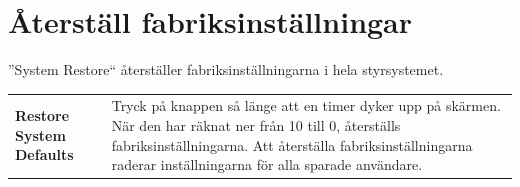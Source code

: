 \documentclass[12pt,a4paper,finnish]{uvmanual}
\begin{document}
\section{Återställ fabriksinställningar}\label{ch:system_restore}

''System Restore`` återställer fabriksinställningarna i hela styrsystemet.


\begin{tabular}{ L{0.2\textwidth} L{0.66\textwidth} }
\textbf{Restore System Defaults} & Tryck på knappen så länge att en timer dyker upp på skärmen. När den har räknat ner från 10 till 0, återställs fabriksinställningarna. Att återställa fabriksinställningarna raderar inställningarna för alla sparade användare.  \\
\end{tabular}
\end{document}
